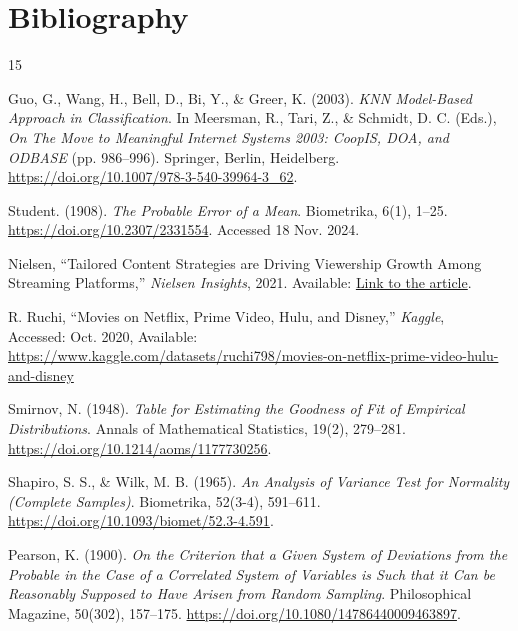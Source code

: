 \section{Bibliography}

\begingroup
\renewcommand{\section}[2]{}%
    \begin{thebibliography}{15}

Guo, G., Wang, H., Bell, D., Bi, Y., \& Greer, K. (2003). 
\textit{KNN Model-Based Approach in Classification}. 
In Meersman, R., Tari, Z., \& Schmidt, D. C. (Eds.), 
\textit{On The Move to Meaningful Internet Systems 2003: CoopIS, DOA, and ODBASE} (pp. 986--996). 
Springer, Berlin, Heidelberg. 
\url{https://doi.org/10.1007/978-3-540-39964-3_62}.

Student. (1908).
\textit{The Probable Error of a Mean}.
Biometrika, 6(1), 1--25.
\url{https://doi.org/10.2307/2331554}. Accessed 18 Nov. 2024.

Nielsen, ``Tailored Content Strategies are Driving Viewership Growth Among Streaming Platforms,'' \textit{Nielsen Insights}, 2021. Available: 
\href{https://www.nielsen.com/insights/2021/tailored-content-strategies-are-driving-viewership-growth-among-streaming-platforms/}{Link to the article}.

R. Ruchi, ``Movies on Netflix, Prime Video, Hulu, and Disney,'' \textit{Kaggle}, \\ Accessed: Oct. 2020, Available: \url{https://www.kaggle.com/datasets/ruchi798/movies-on-netflix-prime-video-hulu-and-disney}

Smirnov, N. (1948). 
\textit{Table for Estimating the Goodness of Fit of Empirical Distributions}. 
Annals of Mathematical Statistics, 19(2), 279--281.
\url{https://doi.org/10.1214/aoms/1177730256}.

Shapiro, S. S., \& Wilk, M. B. (1965).
\textit{An Analysis of Variance Test for Normality (Complete Samples)}.
Biometrika, 52(3-4), 591--611.
\url{https://doi.org/10.1093/biomet/52.3-4.591}.

Pearson, K. (1900).
\textit{On the Criterion that a Given System of Deviations from the Probable in the Case of a Correlated System of Variables is Such that it Can be Reasonably Supposed to Have Arisen from Random Sampling}.
Philosophical Magazine, 50(302), 157--175.
\url{https://doi.org/10.1080/14786440009463897}.


\end{thebibliography}

